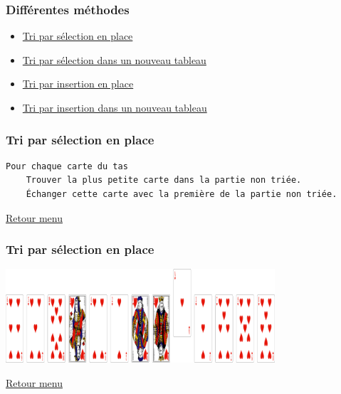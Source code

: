 \documentclass[svgnames,11pt]{beamer}
\begin{document}
\begin{frame}
    \frametitle{\hypertarget{menu}{Différentes méthodes}}

    \begin{itemize}
        \item \hyperlink{selection1}{Tri par sélection en place}
        \item \hyperlink{selection2}{Tri par sélection dans un nouveau tableau}
        \item \hyperlink{insertion1}{Tri par insertion en place}
        \item \hyperlink{insertion2}{Tri par insertion dans un nouveau tableau}
    \end{itemize}

\end{frame}
\begin{frame}[fragile]
    \frametitle{\hypertarget{selection1}{Tri par sélection en place}
    }
    \begin{center}
        \begin{lstlisting}[language=bash, basicstyle=\small]
Pour chaque carte du tas
    Trouver la plus petite carte dans la partie non triée.
    Échanger cette carte avec la première de la partie non triée.
        \end{lstlisting}
        \label{CODE}
    \end{center}
\hyperlink{menu}{Retour menu}
\end{frame}
\begin{frame}
    \frametitle{Tri par sélection en place}

    \begin{center}
        \centering
        \includegraphics[width=10cm]{ressources/selection-1.png}
        \label{pique}
    \end{center}
    \hyperlink{menu}{Retour menu}

\end{frame}
\end{document}
